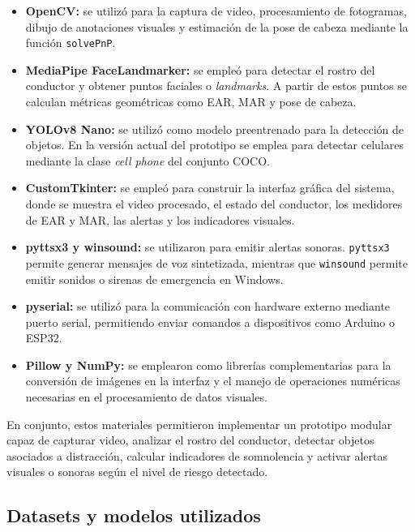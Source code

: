 \documentclass[conference]{IEEEtran}
\begin{document}
\begin{itemize}
    \item \textbf{OpenCV:} se utilizó para la captura de video, procesamiento de fotogramas, dibujo de anotaciones visuales y estimación de la pose de cabeza mediante la función \texttt{solvePnP}.
    
    \item \textbf{MediaPipe FaceLandmarker:} se empleó para detectar el rostro del conductor y obtener puntos faciales o \textit{landmarks}. A partir de estos puntos se calculan métricas geométricas como EAR, MAR y pose de cabeza.
    
    \item \textbf{YOLOv8 Nano:} se utilizó como modelo preentrenado para la detección de objetos. En la versión actual del prototipo se emplea para detectar celulares mediante la clase \textit{cell phone} del conjunto COCO.
    
    \item \textbf{CustomTkinter:} se empleó para construir la interfaz gráfica del sistema, donde se muestra el video procesado, el estado del conductor, los medidores de EAR y MAR, las alertas y los indicadores visuales.
    
    \item \textbf{pyttsx3 y winsound:} se utilizaron para emitir alertas sonoras. \texttt{pyttsx3} permite generar mensajes de voz sintetizada, mientras que \texttt{winsound} permite emitir sonidos o sirenas de emergencia en Windows.
    
    \item \textbf{pyserial:} se utilizó para la comunicación con hardware externo mediante puerto serial, permitiendo enviar comandos a dispositivos como Arduino o ESP32.
    
    \item \textbf{Pillow y NumPy:} se emplearon como librerías complementarias para la conversión de imágenes en la interfaz y el manejo de operaciones numéricas necesarias en el procesamiento de datos visuales.
\end{itemize}

En conjunto, estos materiales permitieron implementar un prototipo modular capaz de capturar video, analizar el rostro del conductor, detectar objetos asociados a distracción, calcular indicadores de somnolencia y activar alertas visuales o sonoras según el nivel de riesgo detectado.

\subsection{Datasets y modelos utilizados}
\end{document}

